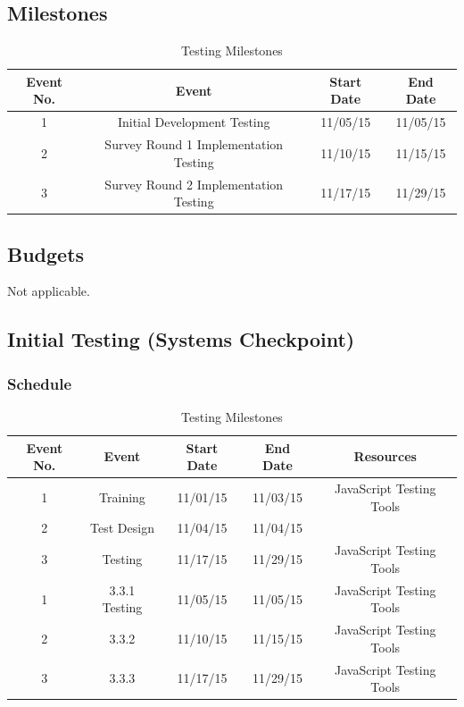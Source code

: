 \documentclass[11pt, oneside]{article}   	%
\begin{document}
\subsection{Milestones}
\begin{table}[H]
\caption{Testing Milestones}
\begin{center}
\begin{tabular}{|c|c|c|c|}
\hline
Event No. & Event & Start Date & End Date\\
\hline
1 & Initial Development Testing & 11/05/15 & 11/05/15\\
\hline
2 & Survey Round 1 Implementation Testing & 11/10/15 & 11/15/15\\
\hline
3 & Survey Round 2 Implementation Testing & 11/17/15 & 11/29/15\\
\hline
\end{tabular}
\end{center}
\label{default}
\end{table}%

\subsection{Budgets}
Not applicable.

\subsection{Initial Testing (Systems Checkpoint)}
\subsubsection{Schedule}
\begin{table}[H]
\caption{Testing Milestones}
\begin{center}
\begin{tabular}{|c|c|c|c|c|}
\hline
Event No. & Event & Start Date & End Date & Resources\\
\hline
1 & Training & 11/01/15 & 11/03/15 & JavaScript Testing Tools\\
\hline
2 & Test Design & 11/04/15 & 11/04/15 & \\
\hline
3 & Testing & 11/17/15 & 11/29/15 & JavaScript Testing Tools\\
\hline
1 & 3.3.1 Testing & 11/05/15 & 11/05/15 & JavaScript Testing Tools\\
\hline
2 & 3.3.2 & 11/10/15 & 11/15/15 & JavaScript Testing Tools\\
\hline
3 & 3.3.3 & 11/17/15 & 11/29/15 & JavaScript Testing Tools\\
\hline
\end{tabular}
\end{center}
\label{default}
\end{table}%
\end{document}
